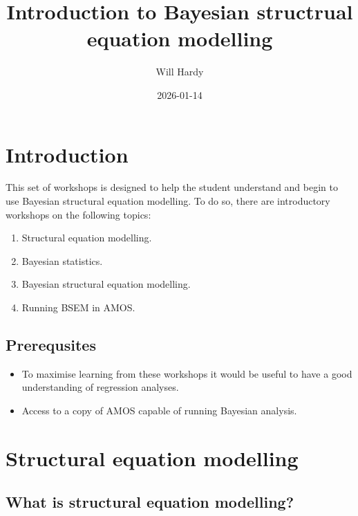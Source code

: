 \documentclass[
]{book}
\title{Introduction to Bayesian structrual equation modelling}
\author{Will Hardy}
\date{2026-01-14}
\providecommand{\tightlist}{%
  \setlength{\itemsep}{0pt}\setlength{\parskip}{0pt}}
\begin{document}
\maketitle

{
\setcounter{tocdepth}{1}
\tableofcontents
}
\chapter{Introduction}\label{introduction}

This set of workshops is designed to help the student understand and begin to use Bayesian structural equation modelling. To do so, there are introductory workshops on the following topics:

\begin{enumerate}
\def\labelenumi{\arabic{enumi}.}
\tightlist
\item
  Structural equation modelling.
\item
  Bayesian statistics.
\item
  Bayesian structural equation modelling.
\item
  Running BSEM in AMOS.
\end{enumerate}

\section{Prerequsites}\label{prerequsites}

\begin{itemize}
\tightlist
\item
  To maximise learning from these workshops it would be useful to have a good understanding of regression analyses.
\item
  Access to a copy of AMOS capable of running Bayesian analysis.
\end{itemize}

\chapter{Structural equation modelling}\label{structural-equation-modelling}

\section{What is structural equation modelling?}\label{what-is-structural-equation-modelling}
\end{document}
